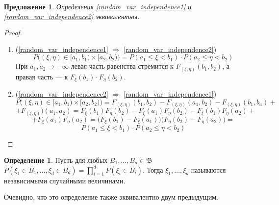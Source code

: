 \documentclass[11pt,openany,a4paper]{scrartcl}
\theoremstyle{plain}
\newtheorem{proposition}[theorem]{Предложение}
\theoremstyle{definition}
\newtheorem{definition}[theorem]{Определение}
\begin{document}
\begin{proposition}
    Определения \ref{random_var_independence1} и \ref{random_var_independence2} 
    эквивалентны.
\end{proposition}
\begin{proof}
\mbox{}
    \begin{enumerate}
        \item (\ref{random_var_independence1} $\Rightarrow$
        \ref{random_var_independence2})
        $$
        P\big((\xi, \eta) \in [a_1, b_1) \times
        [a_2, b_2)\big) = P(a_1 \leqslant \xi < b_1) \cdot P(a_2 \leqslant
        \eta < b_2)
        $$
        При $a_1, a_2 \to -\infty$ левая часть равенства стремится к
        $F_{(\xi, \eta)}(b_1, b_2)$, а правая часть — к
        $F_\xi(b_1)\cdot F_\eta(b_2)$.
        \item (\ref{random_var_independence2} $\Rightarrow$
        \ref{random_var_independence1})
        $$
        P\big((\xi, \eta) \in [a_1, b_1) \times
        [a_2, b_2)\big) = F_{(\xi, \eta)}(b_1, b_2) - F_{(\xi, \eta)}(a_1, b_2)
        - F_{(\xi, \eta)}(b_1, b_a) +
        $$
        $$
        + F_{(\xi, \eta)})(a_1, a_2) = F_\xi(b_1)F_\eta(b_2) - 
        F_\xi(a_1)F_\eta(b_2) - F_\xi(b_1)F_\eta(a_2) +
        $$
        $$
        +F_\xi(a_1)F_\eta(a_2) = \big(F_\xi(b_1) - F_\xi(a_1)\big)
        \big(F_\eta(b_2) - F_\eta(a_2)\big) = 
        $$
        $$
        P(a_1 \leqslant \xi < b_1) \cdot
        P(a_2 \leqslant \eta < b_2)
        $$
    \end{enumerate}
\end{proof}
\begin{definition}\label{random_var_independence3}
    Пусть для любых $B_1,\ldots, B_d \in \mathfrak B$ $P(\xi_1 \in B_1, \ldots,
    \xi_d \in B_d) = \prod\limits_{i=1}^d P(\xi_i \in B_i)$. Тогда $\xi_1, \ldots,
    \xi_d$ называются независимыми случайными величинами.
\end{definition}

Очевидно, что это определение также эквивалентно двум предыдущим.
\end{document}
